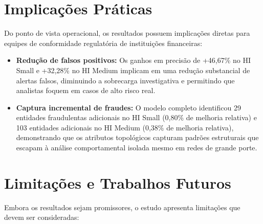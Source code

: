 \documentclass[titlepage,a4paper,oneside,onecolumn,12pt]{report}
\begin{document}
\section*{Implicações Práticas}

Do ponto de vista operacional, os resultados possuem implicações diretas para equipes de conformidade regulatória de instituições financeiras:

\begin{itemize}
  \item \textbf{Redução de falsos positivos:} Os ganhos em precisão de +46,67\% no HI Small e +32,28\% no HI Medium implicam em uma redução substancial de alertas falsos, diminuindo a sobrecarga investigativa e permitindo que analistas foquem em casos de alto risco real.
    
    \item \textbf{Captura incremental de fraudes:} O modelo completo identificou 29 entidades fraudulentas adicionais no HI Small (0,80\% de melhoria relativa) e 103 entidades adicionais no HI Medium (0,38\% de melhoria relativa), demonstrando que os atributos topológicos capturam padrões estruturais que escapam à análise comportamental isolada mesmo em redes de grande porte.
\end{itemize}

\section*{Limitações e Trabalhos Futuros}

Embora os resultados sejam promissores, o estudo apresenta limitações que devem ser consideradas:
\end{document}
